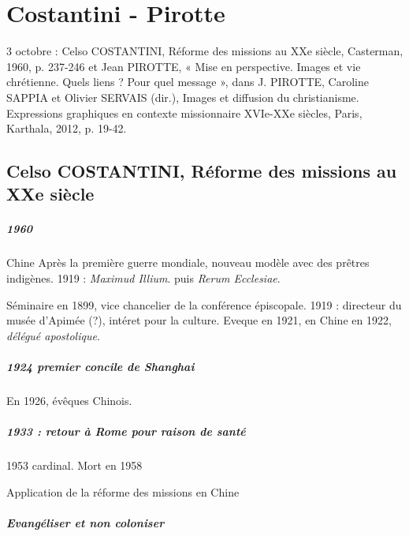 \chapter{Costantini - Pirotte}

	3 octobre : Celso COSTANTINI, Réforme des missions au XXe siècle, Casterman, 1960, p. 237-246 et Jean PIROTTE, « Mise en perspective. Images et vie chrétienne. Quels liens ? Pour quel message », dans J. PIROTTE, Caroline SAPPIA et Olivier SERVAIS (dir.), Images et diffusion du christianisme. Expressions graphiques en contexte missionnaire XVIe-XXe siècles, Paris, Karthala, 2012, p. 19-42. 


\section{Celso COSTANTINI, Réforme des missions au XXe siècle}

\paragraph{1960} Chine
Après la première guerre mondiale, nouveau modèle avec des prêtres indigènes. 1919 : \textit{Maximud Illium}. puis \textit{Rerum Ecclesiae}. 

Séminaire en 1899, vice chancelier de la conférence épiscopale. 1919 : directeur du musée d'Apimée (?), intéret pour la culture. Eveque en 1921, en Chine en 1922, \textit{délégué apostolique}. 

\paragraph{1924 premier concile de Shanghai} En 1926, évêques Chinois.

\paragraph{1933 : retour à Rome pour raison de santé} 1953 cardinal. Mort en 1958

\begin{Synthesis}
    Application de la réforme des missions en Chine
\end{Synthesis}



\paragraph{Evangéliser et non coloniser} 

